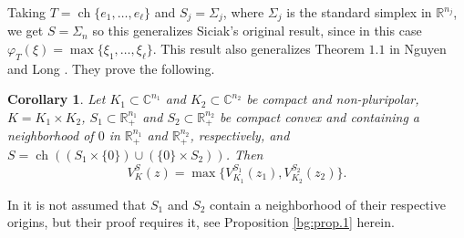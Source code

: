 \documentclass[a4paper,12pt,leqno,english]{article}
\numberwithin{equation}{section}
\newtheorem{corollary+}  [theorem+]  {Corollary}
\newenvironment{corollary}{\begin{corollary+}\sl}{\end{corollary+}\rm}
\begin{document}
Taking $T = \operatorname{ch}\{e_1, \dots, e_\ell\}$ and $S_j = \Sigma_j$, where $\Sigma_j$ is the standard simplex in $\mathbb{R}^{n_j}$,
    we get $S = \Sigma_n$ so this generalizes Siciak's original result, since in this case $\varphi_T(\xi) = \max\{\xi_1, \dots, \xi_\ell\}$.
This result also generalizes Theorem $1.1$ in Nguyen and Long \cite{NguTan:2021}.
They prove the following.
\begin{corollary}
Let
    $K_1 \subset \mathbb{C}^{n_1}$ and $K_2 \subset \mathbb{C}^{n_2}$ be compact and non-pluripolar,
    $K = K_1 \times K_2$,
    $S_1 \subset \mathbb{R}_+^{n_1}$ and $S_2 \subset \mathbb{R}_+^{n_2}$ be compact convex and containing
        a neighborhood of $0$ in $\mathbb{R}^{n_1}_+$ and $\mathbb{R}^{n_2}_+$, respectively, and
    $S = \operatorname{ch} ((S_1 \times \{0\}) \cup (\{0\} \times S_2))$.
Then
\begin{equation*}
    V^S_K(z)
    =
    \max\{V^{S_1}_{K_1}(z_1), V^{S_2}_{K_2}(z_2)\}.
\end{equation*}
\end{corollary}

In \cite{NguTan:2021} it is not assumed that $S_1$ and $S_2$ contain a neighborhood of their respective origins, but their proof requires it,
    see Proposition \ref{bg:prop.1} herein.
\end{document}
